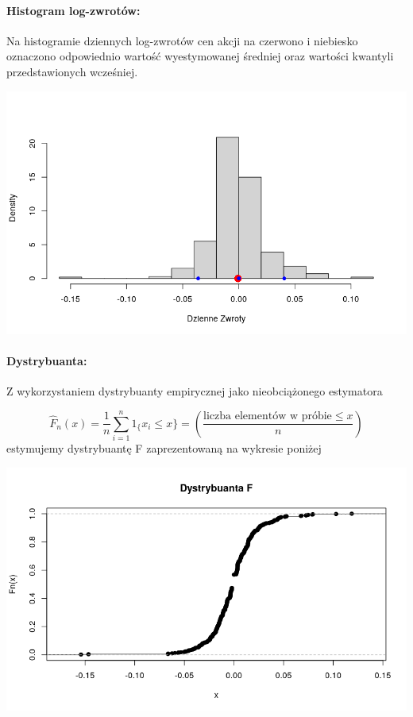 \documentclass[a4paper,11pt]{article}
\begin{document}
\paragraph{Histogram log-zwrotów:}
Na histogramie dziennych log-zwrotów cen akcji na czerwono i niebiesko oznaczono odpowiednio wartość wyestymowanej średniej oraz wartości kwantyli przedstawionych wcześniej.

\centerline{\includegraphics[width=1\textwidth]{./Kajtek/img/histogram_zwrotow.png}}


\newpage
\paragraph{Dystrybuanta:}
Z wykorzystaniem dystrybuanty empirycznej jako nieobciążonego estymatora 

$$\hat{F}_n(x) = \frac{1}{n} \sum_{i=1}^{n} 1_\{x_i \leq x\} = \left(\frac{\text{liczba  elementów  w  próbie} \leq x}{n}\right)$$
estymujemy dystrybuantę F zaprezentowaną na wykresie poniżej

\centerline{\includegraphics[width=1\textwidth]{./Kajtek/img/dystrybuanta.png}}
\end{document}
